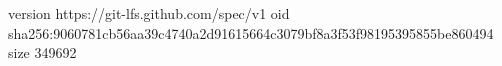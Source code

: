 version https://git-lfs.github.com/spec/v1
oid sha256:9060781cb56aa39c4740a2d91615664c3079bf8a3f53f98195395855be860494
size 349692
